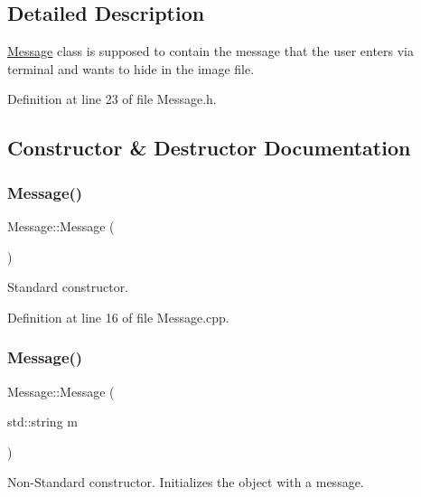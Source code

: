 \subsection{Detailed Description}
\mbox{\hyperlink{classMessage}{Message}} class is supposed to contain the message that the user enters via terminal and wants to hide in the image file. 

Definition at line 23 of file Message.\+h.



\subsection{Constructor \& Destructor Documentation}
\mbox{\label{classMessage_a4fc4f717b634e66070366cb7722d7761}} 
\subsubsection{\texorpdfstring{Message()}{Message()}\hspace{0.1cm}{\footnotesize\ttfamily [1/3]}}
{\footnotesize\ttfamily Message\+::\+Message (\begin{DoxyParamCaption}{ }\end{DoxyParamCaption})}



Standard constructor. 



Definition at line 16 of file Message.\+cpp.

\mbox{\label{classMessage_ad8d8236fe10ad63103a26f84c68bcea6}} 
\subsubsection{\texorpdfstring{Message()}{Message()}\hspace{0.1cm}{\footnotesize\ttfamily [2/3]}}
{\footnotesize\ttfamily Message\+::\+Message (\begin{DoxyParamCaption}\item[{std\+::string}]{m }\end{DoxyParamCaption})}



Non-\/\+Standard constructor. Initializes the object with a message. 


